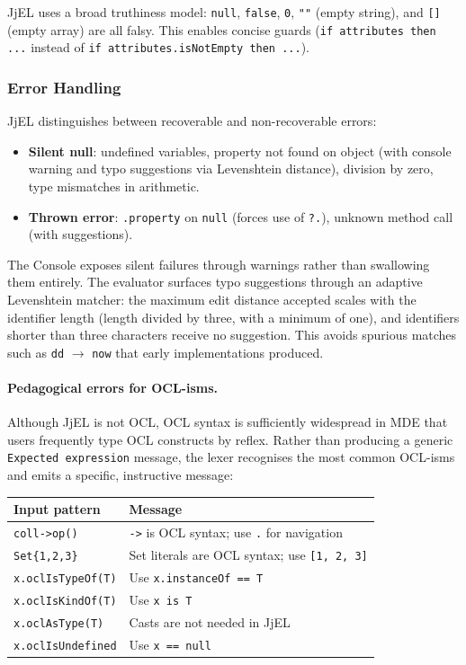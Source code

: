 \documentclass[11pt,a4paper]{article}
\newcommand{\jjel}{\textsf{JjEL}}
\begin{document}
\jjel{} uses a broad truthiness model: \texttt{null}, \texttt{false}, \texttt{0}, \texttt{""} (empty string), and \texttt{[]} (empty array) are all falsy. This enables concise guards (\texttt{if attributes then ...} instead of \texttt{if attributes.isNotEmpty then ...}).

\subsubsection{Error Handling}

\jjel{} distinguishes between recoverable and non-recoverable errors:
\begin{itemize}
    \item \textbf{Silent null}: undefined variables, property not found on object (with console warning and typo suggestions via Levenshtein distance), division by zero, type mismatches in arithmetic.
    \item \textbf{Thrown error}: \texttt{.property} on \texttt{null} (forces use of \texttt{?.}), unknown method call (with suggestions).
\end{itemize}

The Console exposes silent failures through warnings rather than swallowing them entirely. The evaluator surfaces typo suggestions through an adaptive Levenshtein matcher: the maximum edit distance accepted scales with the identifier length (length divided by three, with a minimum of one), and identifiers shorter than three characters receive no suggestion. This avoids spurious matches such as \texttt{dd} \mbox{$\to$} \texttt{now} that early implementations produced.

\paragraph{Pedagogical errors for OCL-isms.} Although \jjel{} is not OCL, OCL syntax is sufficiently widespread in MDE that users frequently type OCL constructs by reflex. Rather than producing a generic \texttt{Expected expression} message, the lexer recognises the most common OCL-isms and emits a specific, instructive message:

\begin{center}
\begin{tabular}{@{}ll@{}}
\toprule
\textbf{Input pattern} & \textbf{Message} \\
\midrule
\texttt{coll->op()} & \texttt{->} is OCL syntax; use \texttt{.} for navigation \\
\texttt{Set\{1,2,3\}} & Set literals are OCL syntax; use \texttt{[1, 2, 3]} \\
\texttt{x.oclIsTypeOf(T)} & Use \texttt{x.instanceOf == T} \\
\texttt{x.oclIsKindOf(T)} & Use \texttt{x is T} \\
\texttt{x.oclAsType(T)} & Casts are not needed in \jjel{} \\
\texttt{x.oclIsUndefined} & Use \texttt{x == null} \\
\bottomrule
\end{tabular}
\end{center}
\end{document}
